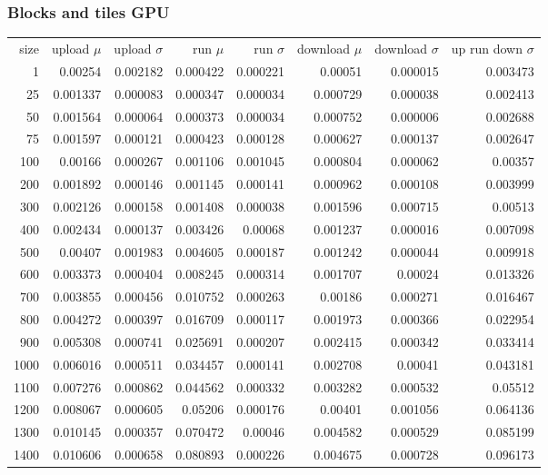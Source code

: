 \subsubsection{Blocks and tiles GPU}

\begin{tabular}{r r r r r r r r}
size & upload $\mu$  & upload $\sigma$ & run $\mu$ & run $\sigma$ & download $\mu$ & download $\sigma$ & up run down $\sigma$ \\
1 & 0.00254 & 0.002182 & 0.000422 & 0.000221 & 0.00051 & 0.000015 & 0.003473 \\
25 & 0.001337 & 0.000083 & 0.000347 & 0.000034 & 0.000729 & 0.000038 & 0.002413 \\
50 & 0.001564 & 0.000064 & 0.000373 & 0.000034 & 0.000752 & 0.000006 & 0.002688 \\
75 & 0.001597 & 0.000121 & 0.000423 & 0.000128 & 0.000627 & 0.000137 & 0.002647 \\
100 & 0.00166 & 0.000267 & 0.001106 & 0.001045 & 0.000804 & 0.000062 & 0.00357 \\
200 & 0.001892 & 0.000146 & 0.001145 & 0.000141 & 0.000962 & 0.000108 & 0.003999 \\
300 & 0.002126 & 0.000158 & 0.001408 & 0.000038 & 0.001596 & 0.000715 & 0.00513 \\
400 & 0.002434 & 0.000137 & 0.003426 & 0.00068 & 0.001237 & 0.000016 & 0.007098 \\
500 & 0.00407 & 0.001983 & 0.004605 & 0.000187 & 0.001242 & 0.000044 & 0.009918 \\
600 & 0.003373 & 0.000404 & 0.008245 & 0.000314 & 0.001707 & 0.00024 & 0.013326 \\
700 & 0.003855 & 0.000456 & 0.010752 & 0.000263 & 0.00186 & 0.000271 & 0.016467 \\
800 & 0.004272 & 0.000397 & 0.016709 & 0.000117 & 0.001973 & 0.000366 & 0.022954 \\
900 & 0.005308 & 0.000741 & 0.025691 & 0.000207 & 0.002415 & 0.000342 & 0.033414 \\
1000 & 0.006016 & 0.000511 & 0.034457 & 0.000141 & 0.002708 & 0.00041 & 0.043181 \\
1100 & 0.007276 & 0.000862 & 0.044562 & 0.000332 & 0.003282 & 0.000532 & 0.05512 \\
1200 & 0.008067 & 0.000605 & 0.05206 & 0.000176 & 0.00401 & 0.001056 & 0.064136 \\
1300 & 0.010145 & 0.000357 & 0.070472 & 0.00046 & 0.004582 & 0.000529 & 0.085199 \\
1400 & 0.010606 & 0.000658 & 0.080893 & 0.000226 & 0.004675 & 0.000728 & 0.096173 \\

\end{tabular}
